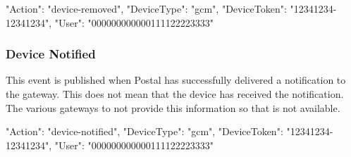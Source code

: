 \documentclass[12pt]{article}
\begin{document}
\begin{Terminal}
{
  "Action": "device-removed",
  "DeviceType": "gcm",
  "DeviceToken": "12341234-12341234",
  "User": "000000000000111122223333"
}
\end{Terminal}

\subsubsection{Device Notified}

This event is published when Postal has successfully delivered a notification to the gateway.
This does not mean that the device has received the notification.
The various gateways to not provide this information so that is not available.

\begin{Terminal}
{
  "Action": "device-notified",
  "DeviceType": "gcm",
  "DeviceToken": "12341234-12341234",
  "User": "000000000000111122223333"
}
\end{Terminal}
\end{document}
